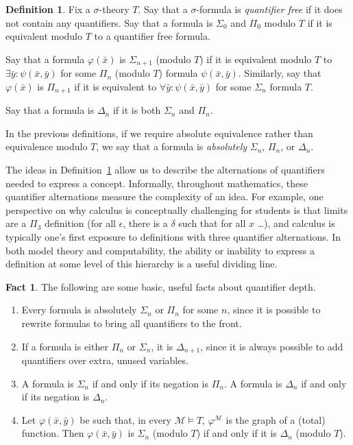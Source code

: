 \documentclass{article}
\theoremstyle{plain}
\theoremstyle{definition}
\newtheorem{defn}[thm]{Definition}
\newtheorem{fact}[thm]{Fact}
\newcommand{\defterm}{\emph}
\newcommand{\tuple}{\bar}
\renewcommand{\phi}{\varphi}
\begin{document}
\begin{defn}\label{defn:quantifier-depth}
  Fix a $\sigma$-theory $T$. Say that a $\sigma$-formula is
  \defterm{quantifier free} if it does not contain any
  quantifiers. Say that a formula is $\Sigma_0$ and $\Pi_0$ modulo $T$
  if it is equivalent modulo $T$ to a quantifier free formula.

  Say that a formula $\phi(\tuple{x})$ is $\Sigma_{n+1}$ (modulo $T$)
  if it is equivalent modulo $T$ to $\exists \tuple{y} :
  \psi(\tuple{x}, \tuple{y})$ for some $\Pi_n$ (modulo $T$) formula
  $\psi(\tuple{x}, \tuple{y})$. Similarly, say that $\phi(\tuple{x})$
  is $\Pi_{n+1}$ if it is equivalent to $\forall \tuple{y} :
  \psi(\tuple{x}, \tuple{y})$ for some $\Sigma_n$ formula $T$.

  Say that a formula is $\Delta_n$ if it is both $\Sigma_n$ and
  $\Pi_n$.

  In the previous definitions, if we require absolute equivalence
  rather than equivalence modulo $T$, we say that a formula is
  \defterm{absolutely} $\Sigma_n$, $\Pi_n$, or $\Delta_n$.
\end{defn}

The ideas in Definition~\ref{defn:quantifier-depth} allow us to
describe the alternations of quantifiers needed to express a
concept. Informally, throughout mathematics, these quantifier
alternations measure the complexity of an idea. For example, one
perspective on why calculus is conceptually challenging for students
is that limits are a $\Pi_3$ definition (for all $\epsilon$, there is
a $\delta$ such that for all $x$ \ldots), and calculus is typically
one's first exposure to definitions with three quantifier
alternations. In both model theory and computability, the ability or
inability to express a definition at some level of this hierarchy is a
useful dividing line.

\begin{fact}
  The following are some basic, useful facts about quantifier depth.
  \begin{enumerate}
  \item Every formula is absolutely $\Sigma_n$ or $\Pi_n$ for some
    $n$, since it is possible to rewrite formulas to bring all
    quantifiers to the front.
  \item If a formula is either $\Pi_n$ or $\Sigma_n$, it is
    $\Delta_{n+1}$, since it is always possible to add quantifiers
    over extra, unused variables.
  \item A formula is $\Sigma_n$ if and only if its negation is
    $\Pi_n$. A formula is $\Delta_n$ if and only if its negation is
    $\Delta_n$.
  \item Let $\phi(\tuple{x}, \tuple{y})$ be such that, in every
    $\mathcal{M} \models T$, $\phi^\mathcal{M}$ is the graph of a
    (total) function. Then $\phi(\tuple{x},\tuple{y})$ is $\Sigma_n$
    (modulo $T$) if and only if it is $\Delta_n$ (modulo $T$).
  \end{enumerate}
\end{fact}
\end{document}
